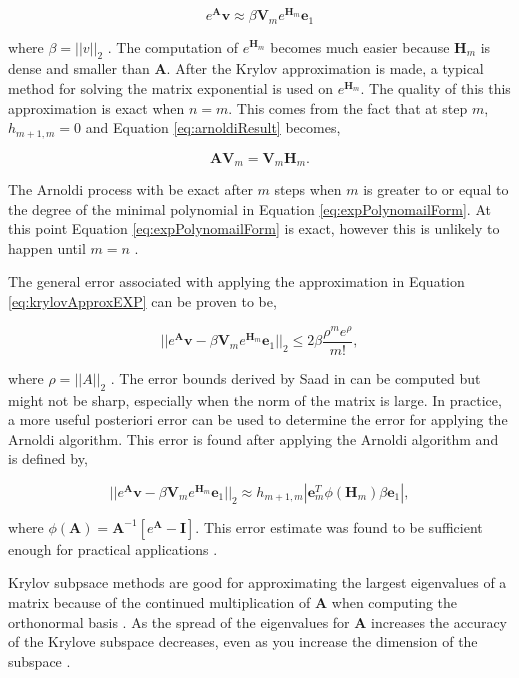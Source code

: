\begin{equation}
    e^{\boldsymbol{A}}\boldsymbol{v} \approx \beta \boldsymbol{V}_{m}e^{\boldsymbol{H}_{m}}\boldsymbol{e}_{1}
    \label{eq:krylovApproxEXP}
\end{equation}

\noindent where $\beta = ||v||_{2}$ \cite{saad1989}. The computation of $e^{
\boldsymbol{H}_{m}}$ becomes much easier because $\boldsymbol{H}_{m}$ is dense and smaller than $\boldsymbol{A}$. After the Krylov approximation is made, a typical method for solving the matrix exponential is used on $e^{\boldsymbol{H}_{m}}$. The quality of this this approximation is exact when $n = m$. This comes from the fact that at step $m$, $h_{m+1,m} = 0$ and Equation \ref{eq:arnoldiResult} becomes,

\begin{equation}
    \boldsymbol{A}\boldsymbol{V}_{m} = \boldsymbol{V}_{m}\boldsymbol{H}_{m}.
\end{equation}

\noindent The Arnoldi process with be exact after $m$ steps when $m$ is greater to or equal to the degree of the minimal polynomial in Equation \ref{eq:expPolynomailForm}. At this point Equation \ref{eq:expPolynomailForm} is exact, however this is unlikely to happen until $m=n$ \cite{saad1992} \cite{saad1989}. 

 The general error associated with applying the approximation in Equation \ref{eq:krylovApproxEXP} can be proven to be,
 
 \begin{equation}
     ||e^{\boldsymbol{A}}\boldsymbol{v} - \beta \boldsymbol{V}_{m}e^{\boldsymbol{H}_{m}}\boldsymbol{e}_{1}||_{2} \leq 2\beta \frac{\rho^{m}e^{\rho}}{m!},
 \end{equation}
 
 \noindent where $\rho = ||A||_{2}$ \cite{saad1992}. The error bounds derived by Saad in \cite{saad1992} can be computed but might not be sharp, especially when the norm of the matrix is large. In practice, a more useful posteriori error can be used to determine the error for applying the Arnoldi algorithm. This error is found after applying the Arnoldi algorithm and is defined by,
 
\begin{equation}
    ||e^{\boldsymbol{A}}\boldsymbol{v} - \beta \boldsymbol{V}_{m}e^{\boldsymbol{H}_{m}}\boldsymbol{e}_{1}||_{2} \approx h_{m+1,m}|\boldsymbol{e}_{m}^{T}\phi(\boldsymbol{H}_{m})\beta \boldsymbol{e}_{1}|,
\end{equation}

\noindent where $\phi(\boldsymbol{A}) = \boldsymbol{A}^{-1}[e^{\boldsymbol{A}} - \boldsymbol{I}]$. This error estimate was found to be sufficient enough for practical applications \cite{saad1992}. 

Krylov subpsace methods are good for approximating the largest eigenvalues of a matrix because of the continued multiplication of $\boldsymbol{A}$ when computing the orthonormal basis \cite{akio2007}. As the spread of the eigenvalues for $\boldsymbol{A}$ increases the accuracy of the Krylove subspace decreases, even as you increase the dimension of the subspace \cite{pusa2010}. 